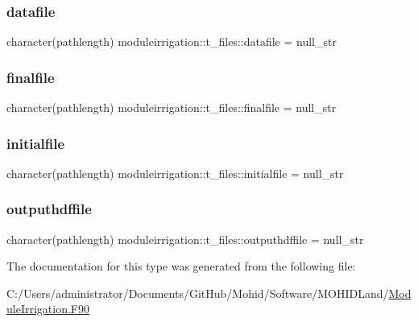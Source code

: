 \subsubsection{\texorpdfstring{datafile}{datafile}}
{\footnotesize\ttfamily character(pathlength) moduleirrigation\+::t\+\_\+files\+::datafile = null\+\_\+str\hspace{0.3cm}{\ttfamily [private]}}

\mbox{\label{structmoduleirrigation_1_1t__files_a07d8e60c85a0df777f34772b48f40eff}} 
\subsubsection{\texorpdfstring{finalfile}{finalfile}}
{\footnotesize\ttfamily character(pathlength) moduleirrigation\+::t\+\_\+files\+::finalfile = null\+\_\+str\hspace{0.3cm}{\ttfamily [private]}}

\mbox{\label{structmoduleirrigation_1_1t__files_a10ec2ddeae4cd0e68a025f33c8d23eea}} 
\subsubsection{\texorpdfstring{initialfile}{initialfile}}
{\footnotesize\ttfamily character(pathlength) moduleirrigation\+::t\+\_\+files\+::initialfile = null\+\_\+str\hspace{0.3cm}{\ttfamily [private]}}

\mbox{\label{structmoduleirrigation_1_1t__files_aca2b741395234190a1d6da6f5facc7c9}} 
\subsubsection{\texorpdfstring{outputhdffile}{outputhdffile}}
{\footnotesize\ttfamily character(pathlength) moduleirrigation\+::t\+\_\+files\+::outputhdffile = null\+\_\+str\hspace{0.3cm}{\ttfamily [private]}}



The documentation for this type was generated from the following file\+:\begin{DoxyCompactItemize}
\item 
C\+:/\+Users/administrator/\+Documents/\+Git\+Hub/\+Mohid/\+Software/\+M\+O\+H\+I\+D\+Land/\mbox{\hyperlink{_module_irrigation_8_f90}{Module\+Irrigation.\+F90}}\end{DoxyCompactItemize}
